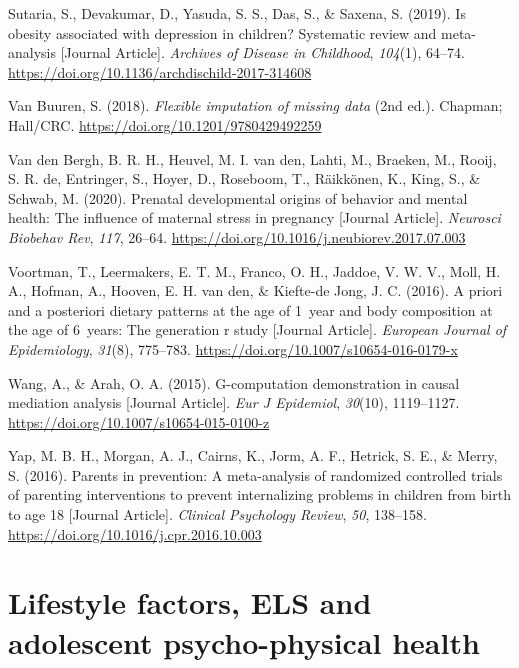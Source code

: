 \documentclass[
  letterpaper,
  DIV=11,
  numbers=noendperiod]{scrreport}
\newlength{\cslhangindent}
\newenvironment{CSLReferences}[2] %
 {\begin{list}{}{%
  \setlength{\itemindent}{0pt}
  \setlength{\leftmargin}{0pt}
  \setlength{\parsep}{0pt}
  \ifodd #1
   \setlength{\leftmargin}{\cslhangindent}
   \setlength{\itemindent}{-1\cslhangindent}
  \fi
  \setlength{\itemsep}{#2\baselineskip}}}
 {\end{list}}
\begin{document}
\begin{CSLReferences}{1}{0}
Sutaria, S., Devakumar, D., Yasuda, S. S., Das, S., \& Saxena, S.
(2019). Is obesity associated with depression in children? Systematic
review and meta-analysis {[}Journal Article{]}. \emph{Archives of
Disease in Childhood}, \emph{104}(1), 64--74.
\url{https://doi.org/10.1136/archdischild-2017-314608}

Van Buuren, S. (2018). \emph{Flexible imputation of missing data} (2nd
ed.). Chapman; Hall/CRC. \url{https://doi.org/10.1201/9780429492259}

Van den Bergh, B. R. H., Heuvel, M. I. van den, Lahti, M., Braeken, M.,
Rooij, S. R. de, Entringer, S., Hoyer, D., Roseboom, T., Räikkönen, K.,
King, S., \& Schwab, M. (2020). Prenatal developmental origins of
behavior and mental health: The influence of maternal stress in
pregnancy {[}Journal Article{]}. \emph{Neurosci Biobehav Rev},
\emph{117}, 26--64.
\url{https://doi.org/10.1016/j.neubiorev.2017.07.003}

Voortman, T., Leermakers, E. T. M., Franco, O. H., Jaddoe, V. W. V.,
Moll, H. A., Hofman, A., Hooven, E. H. van den, \& Kiefte-de Jong, J. C.
(2016). A priori and a posteriori dietary patterns at the age of 1~year
and body composition at the age of 6~years: The generation r study
{[}Journal Article{]}. \emph{European Journal of Epidemiology},
\emph{31}(8), 775--783. \url{https://doi.org/10.1007/s10654-016-0179-x}

Wang, A., \& Arah, O. A. (2015). G-computation demonstration in causal
mediation analysis {[}Journal Article{]}. \emph{Eur J Epidemiol},
\emph{30}(10), 1119--1127.
\url{https://doi.org/10.1007/s10654-015-0100-z}

Yap, M. B. H., Morgan, A. J., Cairns, K., Jorm, A. F., Hetrick, S. E.,
\& Merry, S. (2016). Parents in prevention: A meta-analysis of
randomized controlled trials of parenting interventions to prevent
internalizing problems in children from birth to age 18 {[}Journal
Article{]}. \emph{Clinical Psychology Review}, \emph{50}, 138--158.
\url{https://doi.org/10.1016/j.cpr.2016.10.003}

\end{CSLReferences}

\chapter{Lifestyle factors, ELS and adolescent psycho-physical
health}\label{sec-chapter3}
\end{document}
